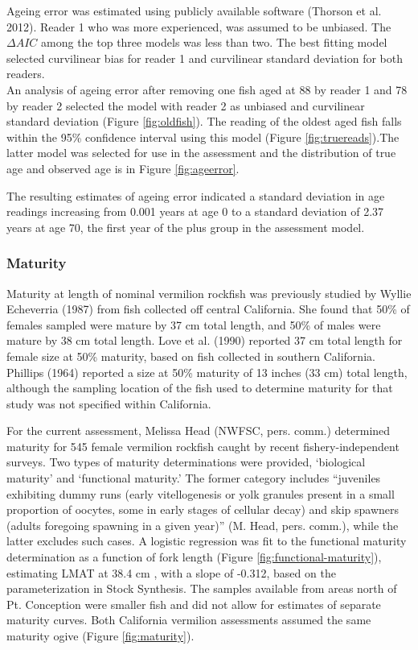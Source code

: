 \documentclass[
  english,
  a4paper,
]{article}
\begin{document}
Ageing error was estimated using publicly available software (Thorson et al. 2012).
Reader 1 who was more
experienced, was assumed to be unbiased. The \(\Delta AIC\) among the top three models was less than two. The
best fitting model selected curvilinear bias for reader 1 and curvilinear standard
deviation for both readers.\\
An analysis of ageing error after removing one fish aged at 88 by reader 1 and 78 by reader 2
selected the model with reader 2 as unbiased and curvilinear standard deviation
(Figure \ref{fig:oldfish}). The reading of the oldest aged fish falls within the 95\% confidence
interval using this model (Figure \ref{fig:truereads}).The latter model was selected
for use in the assessment and the distribution of true age and observed
age is in Figure \ref{fig:ageerror}.

The resulting estimates of ageing error indicated a standard deviation in age readings
increasing from 0.001 years at age 0 to a standard deviation of 2.37 years at age 70,
the first year of the plus group in the assessment model.

\hypertarget{maturity}{%
\subsubsection{Maturity}\label{maturity}}

Maturity at length of nominal vermilion rockfish was previously studied by Wyllie Echeverria (1987) from fish collected off central California. She found that 50\% of females sampled were mature by 37 cm total length, and 50\% of males were mature by 38 cm total length. Love et al. (1990) reported 37 cm total length for female size at 50\% maturity, based on fish collected in southern California. Phillips (1964) reported a size at 50\% maturity of 13 inches (33 cm) total length, although the sampling location of the fish used to determine maturity for that study was not specified within California.

For the current assessment, Melissa Head (NWFSC, pers. comm.) determined maturity
for 545 female vermilion rockfish caught by recent fishery-independent surveys. Two types
of maturity determinations were provided, `biological maturity' and `functional
maturity.' The former category includes ``juveniles exhibiting dummy runs (early
vitellogenesis or yolk granules present in a small proportion of oocytes, some
in early stages of cellular decay) and skip spawners (adults foregoing spawning
in a given year)'' (M. Head, pers. comm.), while the latter excludes such cases.
A logistic regression was fit to the functional maturity determination as a function of fork length (Figure \ref{fig:functional-maturity}), estimating LMAT at 38.4 cm , with a slope of -0.312,
based on the parameterization in Stock Synthesis. The samples available from areas north of Pt. Conception were smaller fish and did not allow for estimates of separate
maturity curves. Both California vermilion assessments assumed the same maturity
ogive (Figure \ref{fig:maturity}).
\end{document}

